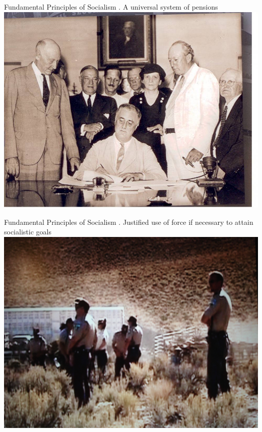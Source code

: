 \begin{frame}[t]{Fundamental Principles of Socialism}
    . A universal system of pensions \\
    \includegraphics[width=.9\textwidth]{img/pensions.jpg} \\
\end{frame}

\begin{frame}[t]{Fundamental Principles of Socialism}
    . Justified use of force if necessary to attain socialistic goals
    \includegraphics[width=.9\textwidth]{img/justified-force.jpg} \\
\end{frame}

